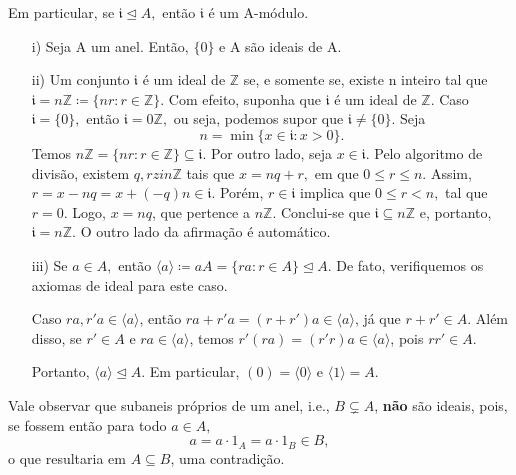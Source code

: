 \documentclass[AlgebraII/algebraII_notes.tex]{subfiles}
\begin{document}
Em particular, se \(\mathfrak{i} \trianglelefteq{A},\) então \(\mathfrak{i}\) é um A-módulo.
\begin{example}
	\begin{itemize}
		\item[i)] Seja A um anel. Então, \(\{0\}\) e A são ideais de A.
		\item[ii)] Um conjunto \(\mathfrak{i}\) é um ideal de \(\mathbb{Z}\) se, e somente se, existe n inteiro tal que \(\mathfrak{i} = n \mathbb{Z}\coloneqq \{nr:r\in \mathbb{Z}\}\).
		      Com efeito, suponha que \(\mathfrak{i}\) é um ideal de \(\mathbb{Z}.\) Caso \(\mathfrak{i} = \{0\},\) então \(\mathfrak{i} = 0 \mathbb{Z},\) ou seja, podemos supor que \(\mathfrak{i}\neq \{0\}.\) Seja
		      \[
			      n = \min\{x\in \mathfrak{i}: x > 0\}.
		      \]
		      Temos \(n \mathbb{Z} = \{nr:r\in \mathbb{Z}\}\subseteq \mathfrak{i}\). Por outro lado, seja \(x\in \mathfrak{i}.\) Pelo algoritmo de divisão, existem
		      \(q, rzin \mathbb{Z}\) tais que \(x = nq + r,\) em que \( 0 \leq r \leq n\). Assim, \(r = x-nq = x + (-q)n\in \mathfrak{i}\).
		      Porém, \(r\in \mathfrak{i}\) implica que \(0\leq r < n,\) tal que \( r = 0\). Logo,
		      \(x = nq \), que pertence a \(n \mathbb{Z}.\) Conclui-se que \(\mathfrak{i}\subseteq n \mathbb{Z}\) e, portanto, \(\mathfrak{i} = n \mathbb{Z}\). O outro lado da
		      afirmação é automático.
		\item[iii)] Se \(a\in A,\) então \(\langle a \rangle\coloneqq aA = \{ra: r\in A\}\trianglelefteq{A}.\) De fato,
		      verifiquemos os axiomas de ideal para este caso.

		      Caso \(ra, r'a\in \langle a \rangle\), então \(ra + r'a = (r+r')a\in \langle a \rangle\), já que \(r + r'\in A.\)
		      Além disso, se \(r'\in A\) e \(ra\in \langle a \rangle\), temos \(r'(ra) = (r'r)a\in \langle a \rangle\), pois \(rr'\in A.\)

		      Portanto, \(\langle a \rangle \trianglelefteq{A}\). Em particular, \((0) = \langle 0 \rangle\) e \(\langle 1 \rangle = A.\)
	\end{itemize}
\end{example}
Vale observar que subaneis próprios de um anel, i.e., \(B\subsetneq A\), \textbf{não} são ideais, pois, se fossem então para todo \(a\in A,\)
\[
	a = a \cdot 1_{A} = a \cdot 1_{B}\in B,
\]
o que resultaria em \(A\subseteq B\), uma contradição.
\end{document}
